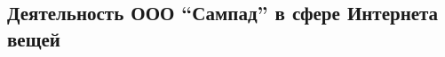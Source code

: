 \subsection{Деятельность ООО \enquote{Сампад} в сфере Интернета вещей}
\label{sec:develop:companyGarlands}



